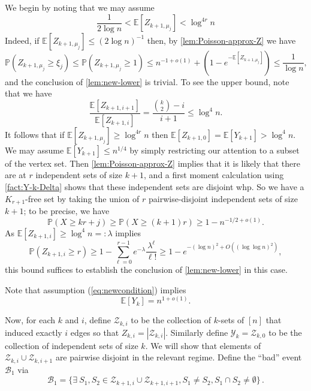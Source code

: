 \documentclass[11pt]{article}
\theoremstyle{definition}
\theoremstyle{remark}
\newcommand{\cZ}{\mathcal{Z}}
\newcommand{\cY}{\mathcal{Y}}
\newcommand{\EE}{\mathbb{E}}
\newcommand{\E}{\mathbb{E}}
\newcommand{\PP}{\mathbb{P}}
\newcommand{\cB}{\mathcal{B}}
\begin{document}
We begin by noting that we may assume
\begin{equation}
\label{eq:newcondition}
\frac{1}{ 2 \log n} < \E[Z_{k+1, \mu_j}] < \log^{4r} n
\end{equation}
Indeed, if $ \EE[Z_{k+1, \mu_j}] \leq (2\log n)^{-1}$ then, by \cref{lem:Poisson-approx-Z} we have 
\[ \PP( Z_{k+1, \mu_j} \ge \xi_j) \le \PP(Z_{k+1, \mu_j} \ge 1) \le  n^{-1+o(1)} + \left(1 - e^{-\E[ Z_{k+1, \mu_j}]} \right)  \le \frac{1}{\log n}, \]
and the conclusion of \cref{lem:new-lower} is trivial. To see
the upper bound, note that we have
\begin{equation}
\label{eq:Zratio}
\frac{ \E[ Z_{k+1, i+1}] }{ \E[ Z_{k+1, i}]} = \frac{ \binom{k}{2}- i }{ i+1} \le \log^4 n . 
\end{equation}
It follows that if $ \EE[Z_{k+1, \mu_j}] \ge \log^{4r} n$
then $\E[ Z_{k+1,0}] = \E[Y_{k+1}] > \log^{4} n$. We may assume 
$ \E[ Y_{k+1}] \le n^{1/4}$ by simply restricting our attention to a subset of the vertex set. Then \cref{lem:Poisson-approx-Z} implies that it is likely that there are at $r$ independent sets of size $k+1$, and a first moment calculation using \cref{fact:Y-k-Delta} shows that these independent sets are disjoint whp. So
we have a $ K_{r+1}$-free set by taking the union of $r$ pairwise-disjoint independent sets of
size $k+1$; to be precise, we have
\[ \PP( X \ge kr+j) \ge \PP( X \ge (k+1)r) \ge  1 - n^{-1/2+ o(1)}. \]
As $ \E[ Z_{k+1,i}] \ge \log^4 n =: \lambda$ implies
\[  \PP( Z_{k+1,i} \ge r) \ge 1 - \sum_{\ell = 0}^{r-1} e^{-\lambda} \frac{ \lambda^\ell}{ \ell!} \ge 1 - e^{ -( \log n)^2 + O( (\log \log n)^2)},  \]
this bound suffices to establish the conclusion of \cref{lem:new-lower} in this
case. 

Note that assumption (\ref{eq:newcondition}) implies
\[ \E[ Y_k] = n^{1 + o(1)}. \]


Now, 
for each $k$ and $i$, define $\cZ_{k,i}$ to be the collection of $k$-sets of $[n]$ that induced exactly  $i$ edges so that $Z_{k,i} = |\cZ_{k,i}|$.  Similarly define $\cY_k = \cZ_{k,0}$ to be the collection of independent sets of size $k$. 
We will show that elements of $\cZ_{k,i} \cup \cZ_{k,i+1}$ are pairwise disjoint in the relevant regime. Define the ``bad'' event $\cB_1$ via $$\cB_1 = \{\exists~S_1,S_2 \in \cZ_{k+1,i} \cup \cZ_{k+1,i+1}, S_1 \neq S_2, S_1 \cap S_2 \neq \emptyset\}\,.$$
\end{document}
